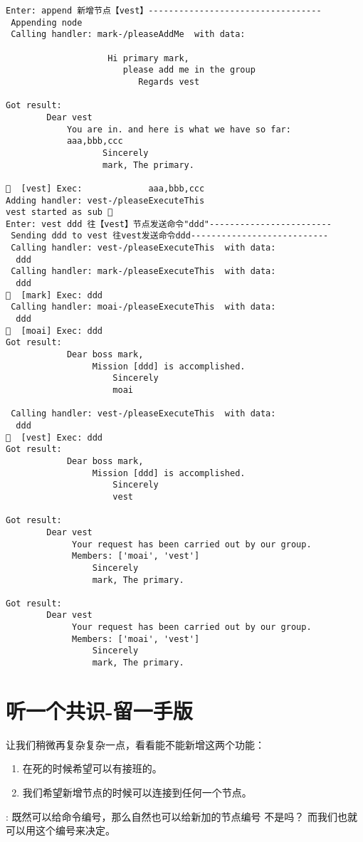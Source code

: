 \begin{tcolorbox}[breakable]
\begin{verbatim}
Enter: append 新增节点【vest】----------------------------------
 Appending node 
 Calling handler: mark-/pleaseAddMe  with data:
  
                    Hi primary mark,
                       please add me in the group
                          Regards vest
                     
Got result: 
        Dear vest
            You are in. and here is what we have so far:
            aaa,bbb,ccc
                   Sincerely
                   mark, The primary.
         
🦜  [vest] Exec:             aaa,bbb,ccc 
Adding handler: vest-/pleaseExecuteThis
vest started as sub 🐸
Enter: vest ddd 往【vest】节点发送命令"ddd"------------------------
 Sending ddd to vest 往vest发送命令ddd---------------------------
 Calling handler: vest-/pleaseExecuteThis  with data:
  ddd 
 Calling handler: mark-/pleaseExecuteThis  with data:
  ddd 
🦜  [mark] Exec: ddd 
 Calling handler: moai-/pleaseExecuteThis  with data:
  ddd 
🦜  [moai] Exec: ddd 
Got result: 
            Dear boss mark,
                 Mission [ddd] is accomplished.
                     Sincerely
                     moai
             
 Calling handler: vest-/pleaseExecuteThis  with data:
  ddd 
🦜  [vest] Exec: ddd 
Got result: 
            Dear boss mark,
                 Mission [ddd] is accomplished.
                     Sincerely
                     vest
             
Got result: 
        Dear vest
             Your request has been carried out by our group.
             Members: ['moai', 'vest']
                 Sincerely
                 mark, The primary.
         
Got result: 
        Dear vest
             Your request has been carried out by our group.
             Members: ['moai', 'vest']
                 Sincerely
                 mark, The primary.

\end{verbatim}

\end{tcolorbox}
\section{听一个共识-留一手版}

让我们稍微再复杂复杂一点，看看能不能新增这两个功能：
\begin{enumerate}
\item 在死的时候希望可以有接班的。
\item 我们希望新增节点的时候可以连接到任何一个节点。
\end{enumerate}
 : 既然可以给命令编号，那么自然也可以给新加的节点编号
不是吗？ 而我们也就可以用这个编号来决定。

